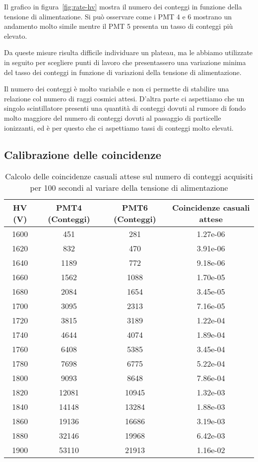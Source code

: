 \documentclass[a4paper,10pt]{article}
\begin{document}
Il grafico in figura~\ref{fig:rate-hv} mostra il numero dei conteggi in funzione della tensione di alimentazione. Si può osservare come i PMT 4 e 6 mostrano un andamento molto simile mentre il PMT 5 presenta un tasso di conteggi più elevato.

Da queste misure risulta difficile individuare un plateau, ma le abbiamo utilizzate in seguito per scegliere punti di lavoro che presentassero una variazione minima del tasso dei conteggi in funzione di variazioni della tensione di alimentazione.

Il numero dei conteggi è molto variabile e non ci permette di stabilire una relazione col numero di raggi cosmici attesi. D'altra parte ci aspettiamo che un singolo scintillatore presenti una quantità di conteggi dovuti al rumore di fondo molto maggiore del numero di conteggi dovuti al passaggio di particelle ionizzanti, ed è per questo che ci aspettiamo tassi di conteggi molto elevati.

\subsection{Calibrazione delle coincidenze}
\begin{table}
\centering
\begin{tabular}{|c|c|c|c|}
\hline
\textbf{HV (V)} & \textbf{PMT4 (Conteggi)} & \textbf{PMT6 (Conteggi)} & \textbf{Coincidenze casuali attese} \\
\hline 
1600 & 451 & 281 & 1.27e-06 \\
\hline
1620 & 832 & 470 & 3.91e-06 \\
\hline
1640 & 1189 & 772 & 9.18e-06 \\
\hline
1660 & 1562 & 1088 & 1.70e-05 \\
\hline
1680 & 2084 & 1654 & 3.45e-05 \\
\hline
1700 & 3095 & 2313 & 7.16e-05 \\
\hline
1720 & 3815 & 3189 & 1.22e-04 \\
\hline
1740 & 4644 & 4074 & 1.89e-04 \\
\hline
1760 & 6408 & 5385 & 3.45e-04 \\
\hline
1780 & 7698 & 6775 & 5.22e-04 \\
\hline
1800 & 9093 & 8648 & 7.86e-04 \\
\hline
1820 & 12081 & 10945 & 1.32e-03 \\
\hline
1840 & 14148 & 13284 & 1.88e-03 \\
\hline
1860 & 19136 & 16686 & 3.19e-03 \\
\hline
1880 & 32146 & 19968 & 6.42e-03 \\
\hline
1900 & 53110 & 21913 & 1.16e-02 \\
\hline

\end{tabular} 
\caption{Calcolo delle coincidenze casuali attese sul numero di conteggi acquisiti per 100 secondi al variare della tensione di alimentazione}
\label{tab:random_coincidence}
\end{table}
\end{document}

